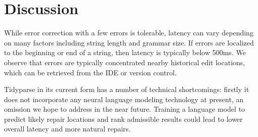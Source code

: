 \documentclass[sigplan,review,anonymous,acmsmall]{acmart}\settopmatter{printfolios=false,printccs=false,printacmref=false}
\begin{document}
%
%
%
%
%
%

\pagebreak\section{Discussion}\label{sec:discussion}

While error correction with a few errors is tolerable, latency can vary depending on many factors including string length and grammar size. If errors are localized to the beginning or end of a string, then latency is typically below 500ms. We observe that errors are typically concentrated nearby historical edit locations, which can be retrieved from the IDE or version control.

Tidyparse in its current form has a number of technical shortcomings: firstly it does not incorporate any neural language modeling technology at present, an omission we hope to address in the near future. Training a language model to predict likely repair locations and rank admissible results could lead to lower overall latency and more natural repairs.
\end{document}
